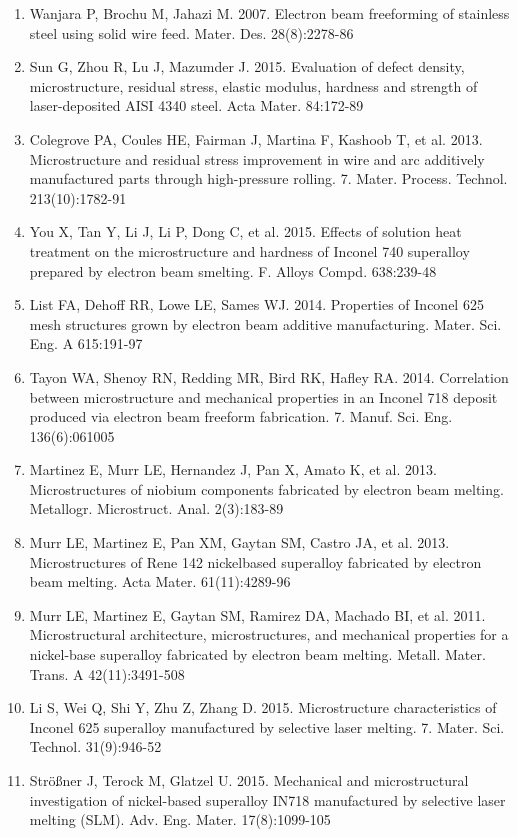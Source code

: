 \documentclass[10pt]{article}
\begin{document}
\begin{enumerate}
  \item Wanjara P, Brochu M, Jahazi M. 2007. Electron beam freeforming of stainless steel using solid wire feed. Mater. Des. 28(8):2278-86

  \item Sun G, Zhou R, Lu J, Mazumder J. 2015. Evaluation of defect density, microstructure, residual stress, elastic modulus, hardness and strength of laser-deposited AISI 4340 steel. Acta Mater. 84:172-89

  \item Colegrove PA, Coules HE, Fairman J, Martina F, Kashoob T, et al. 2013. Microstructure and residual stress improvement in wire and arc additively manufactured parts through high-pressure rolling. 7. Mater. Process. Technol. 213(10):1782-91

  \item You X, Tan Y, Li J, Li P, Dong C, et al. 2015. Effects of solution heat treatment on the microstructure and hardness of Inconel 740 superalloy prepared by electron beam smelting. F. Alloys Compd. 638:239-48

  \item List FA, Dehoff RR, Lowe LE, Sames WJ. 2014. Properties of Inconel 625 mesh structures grown by electron beam additive manufacturing. Mater. Sci. Eng. A 615:191-97

  \item Tayon WA, Shenoy RN, Redding MR, Bird RK, Hafley RA. 2014. Correlation between microstructure and mechanical properties in an Inconel 718 deposit produced via electron beam freeform fabrication. 7. Manuf. Sci. Eng. 136(6):061005

  \item Martinez E, Murr LE, Hernandez J, Pan X, Amato K, et al. 2013. Microstructures of niobium components fabricated by electron beam melting. Metallogr. Microstruct. Anal. 2(3):183-89

  \item Murr LE, Martinez E, Pan XM, Gaytan SM, Castro JA, et al. 2013. Microstructures of Rene 142 nickelbased superalloy fabricated by electron beam melting. Acta Mater. 61(11):4289-96

  \item Murr LE, Martinez E, Gaytan SM, Ramirez DA, Machado BI, et al. 2011. Microstructural architecture, microstructures, and mechanical properties for a nickel-base superalloy fabricated by electron beam melting. Metall. Mater. Trans. A 42(11):3491-508

  \item Li S, Wei Q, Shi Y, Zhu Z, Zhang D. 2015. Microstructure characteristics of Inconel 625 superalloy manufactured by selective laser melting. 7. Mater. Sci. Technol. 31(9):946-52

  \item Strößner J, Terock M, Glatzel U. 2015. Mechanical and microstructural investigation of nickel-based superalloy IN718 manufactured by selective laser melting (SLM). Adv. Eng. Mater. 17(8):1099-105

\end{enumerate}
\end{document}
